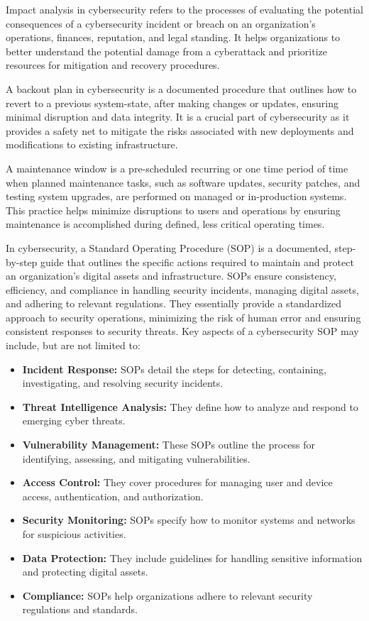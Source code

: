  Impact analysis in cybersecurity refers to the processes of evaluating the potential consequences of a cybersecurity incident or breach on an organization's operations, finances, reputation, and legal standing. It helps organizations to better understand the potential damage from a cyberattack and prioritize resources for mitigation and recovery procedures.

 A backout plan in cybersecurity is a documented procedure that outlines how to revert to a previous system-state, after making changes or updates, ensuring minimal disruption and data integrity. It is a crucial part of cybersecurity as it provides a safety net to mitigate the risks associated with new deployments and modifications to existing infrastructure.

 A maintenance window is a pre-scheduled recurring or one time period of time when planned maintenance tasks, such as software updates, security patches, and testing system upgrades, are performed on managed or in-production systems. This practice helps minimize disruptions to users and operations by ensuring maintenance is accomplished during defined, less critical operating times.

  In cybersecurity, a Standard Operating Procedure (SOP) is a documented, step-by-step guide that outlines the specific actions required to maintain and protect an organization's digital assets and infrastructure. SOPs ensure consistency, efficiency, and compliance in handling security incidents, managing digital assets, and adhering to relevant regulations. They essentially provide a standardized approach to security operations, minimizing the risk of human error and ensuring consistent responses to security threats. Key aspects of a cybersecurity SOP may include, but are not limited to:
\begin{itemize}
    \item \textbf{Incident Response:} SOPs detail the steps for detecting, containing, investigating, and resolving security incidents.
    \item \textbf{Threat Intelligence Analysis:} They define how to analyze and respond to emerging cyber threats.
    \item \textbf{Vulnerability Management:} These SOPs outline the process for identifying, assessing, and mitigating vulnerabilities.
    \item \textbf{Access Control:} They cover procedures for managing user and device access, authentication, and authorization.
    \item \textbf{Security Monitoring:} SOPs specify how to monitor systems and networks for suspicious activities.
    \item \textbf{Data Protection:} They include guidelines for handling sensitive information and protecting digital assets.
    \item \textbf{Compliance:} SOPs help organizations adhere to relevant security regulations and standards.
\end{itemize}


